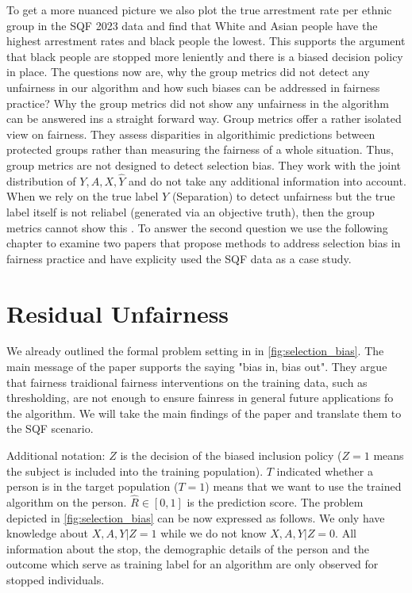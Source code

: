 To get a more nuanced picture we also plot the true arrestment rate per ethnic group in the SQF 2023 data and find that White and Asian people have the highest arrestment rates and black people the lowest. This supports the argument that black people are stopped more leniently and there is a biased decision policy in place. The questions now are, why the group metrics did not detect any unfairness in our algorithm and how such biases can be addressed in fairness practice?
Why the group metrics did not show any unfairness in the algorithm can be answered ins a straight forward way. Group metrics offer a rather isolated view on fairness. They assess disparities in algorithimic predictions between protected groups rather than measuring the fairness of a whole situation. Thus, group metrics are not designed to detect selection bias. They work with the joint distribution of $Y, A, X, \hat{Y}$ and do not take any additional information into account. When we rely on the true label $Y$ (Separation) to detect unfairness but the true label itself is not reliabel (generated via an objective truth), then the group metrics cannot show this \cite{castelnovo2022}.
To answer the second question we use the following chapter to examine two papers that propose methods to address selection bias in fairness practice and have explicity used the SQF data as a case study.

\section{Residual Unfairness}
We already outlined the formal problem setting in \cite{kallus} in \autoref{fig:selection_bias}. The main message of the paper supports the saying "bias in, bias out". They argue that fairness traidional fairness interventions on the training data, such as thresholding, are not enough to ensure fainress in general future applications fo the algorithm. We will take the main findings of the paper and translate them to the SQF scenario.

Additional notation: $Z$ is the decision of the biased inclusion policy ($Z= 1$ means the subject is included into the training population). $T$ indicated whether a person is in the target population ($T = 1$) means that we want to use the trained algorithm on the person. $\hat{R} \in [0,1]$ is the prediction score.
The problem depicted in \autoref{fig:selection_bias} can be now expressed as follows. We only have knowledge about $X, A, Y | Z = 1$ while we do not know $X, A, Y | Z = 0$. All information about the stop, the demographic details of the person and the outcome which serve as training label for an algorithm are only observed for stopped individuals.

